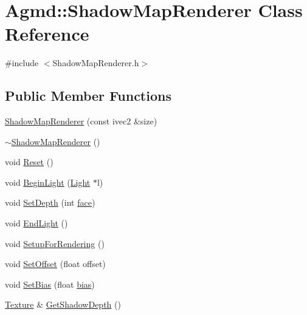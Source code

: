 \hypertarget{class_agmd_1_1_shadow_map_renderer}{\section{Agmd\+:\+:Shadow\+Map\+Renderer Class Reference}
\label{class_agmd_1_1_shadow_map_renderer}
}


{\ttfamily \#include $<$Shadow\+Map\+Renderer.\+h$>$}

\subsection*{Public Member Functions}
\begin{DoxyCompactItemize}
\item 
\hyperlink{class_agmd_1_1_shadow_map_renderer_a567c7248fc68db71505dec99ca355232}{Shadow\+Map\+Renderer} (const ivec2 \&size)
\item 
\hyperlink{class_agmd_1_1_shadow_map_renderer_a6b8042a9c8b5df71fd4fbbc5d1f2b831}{$\sim$\+Shadow\+Map\+Renderer} ()
\item 
void \hyperlink{class_agmd_1_1_shadow_map_renderer_a9ae89af74745498536b08a4d15be5f2b}{Reset} ()
\item 
void \hyperlink{class_agmd_1_1_shadow_map_renderer_a65a0e1acfcf542199e9c3adf3f35d858}{Begin\+Light} (\hyperlink{class_agmd_1_1_light}{Light} $\ast$l)
\item 
void \hyperlink{class_agmd_1_1_shadow_map_renderer_ada9b1959737d3185751cb0e19b3da07c}{Set\+Depth} (int \hyperlink{_planet_8cpp_ae1161f79bdbe47164b23549af2139d25}{face})
\item 
void \hyperlink{class_agmd_1_1_shadow_map_renderer_a64aaab89fd83cdbba0118f3a15ee5ea2}{End\+Light} ()
\item 
void \hyperlink{class_agmd_1_1_shadow_map_renderer_aef356746d079136cd09528d90cfbdb5c}{Setup\+For\+Rendering} ()
\item 
void \hyperlink{class_agmd_1_1_shadow_map_renderer_a5b4cf77a8fd4a530d7cde9bc2850ffb1}{Set\+Offset} (float offset)
\item 
void \hyperlink{class_agmd_1_1_shadow_map_renderer_a25f55cbeb9a493320b0fd2d47d412e53}{Set\+Bias} (float \hyperlink{class_agmd_1_1_shadow_map_renderer_afd8762e31e09edcb711068697e1f6911}{bias})
\item 
\hyperlink{class_agmd_1_1_texture}{Texture} \& \hyperlink{class_agmd_1_1_shadow_map_renderer_a2440781dce0eaf619c714fcd4feb93c8}{Get\+Shadow\+Depth} ()
\end{DoxyCompactItemize}
